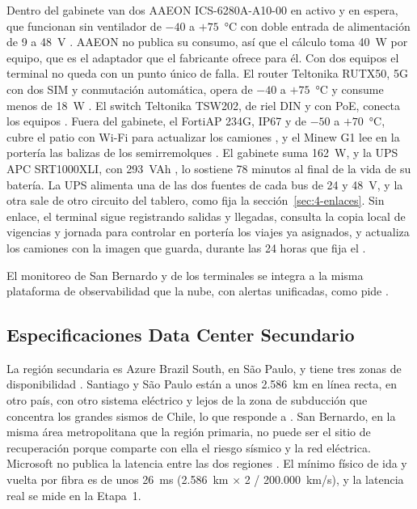 Dentro del gabinete van dos AAEON ICS-6280A-A10-00 en activo y en espera, que funcionan sin ventilador de
$-40$ a $+75$~°C con doble entrada de alimentación de 9 a 48~V \parencite{aaeon_ics6280}. AAEON no publica
su consumo, así que el cálculo toma 40~W por equipo, que es el adaptador que el fabricante ofrece para él.
Con dos equipos el terminal no queda con un punto único de falla. El router Teltonika RUTX50, 5G con dos
SIM y conmutación automática, opera de $-40$ a $+75$~°C y consume menos de 18~W
\parencite{teltonika_rutx50}. El switch Teltonika TSW202, de riel DIN y con PoE, conecta los equipos
\parencite{teltonika_tsw202}. Fuera del gabinete, el FortiAP 234G, IP67 y de $-50$ a $+70$~°C, cubre el
patio con Wi-Fi para actualizar los camiones \parencite{fortinet_fap}, y el Minew G1 lee en la portería
las balizas de los semirremolques \parencite{minew_g1}. El gabinete suma 162~W, y la UPS APC SRT1000XLI,
con 293~VAh \parencite{apc_srt1000}, lo sostiene 78 minutos al final de la vida de su batería. La UPS
alimenta una de las dos fuentes de cada bus de 24 y 48~V, y la otra sale de otro circuito del tablero,
como fija la sección~\ref{sec:4-enlaces}. Sin enlace,
el terminal sigue registrando salidas y llegadas, consulta la copia local de vigencias y jornada para
controlar en portería los viajes ya asignados, y actualiza los camiones con la imagen que guarda, durante las 24 horas que fija el
.

El monitoreo de San Bernardo y de los terminales se integra a la misma plataforma de observabilidad que
la nube, con alertas unificadas, como pide .

\subsection{Especificaciones Data Center Secundario}\label{sec:4-dc-secundario}

La región secundaria es Azure Brazil South, en São Paulo, y tiene tres zonas de disponibilidad
\parencite{ms_regions}. Santiago y São Paulo están a unos 2.586~km en línea recta, en
otro país, con otro sistema eléctrico y lejos de la zona de subducción que concentra los grandes
sismos de Chile, lo que responde a . San Bernardo, en la misma área metropolitana
que la región primaria, no puede ser el sitio de recuperación porque comparte con ella el riesgo
sísmico y la red eléctrica. Microsoft no publica la latencia entre las dos regiones
\parencite{ms_latencia}. El mínimo físico de ida y vuelta por fibra es de unos 26~ms (2.586~km × 2 /
200.000~km/s), y la latencia real se mide en la Etapa~1.


